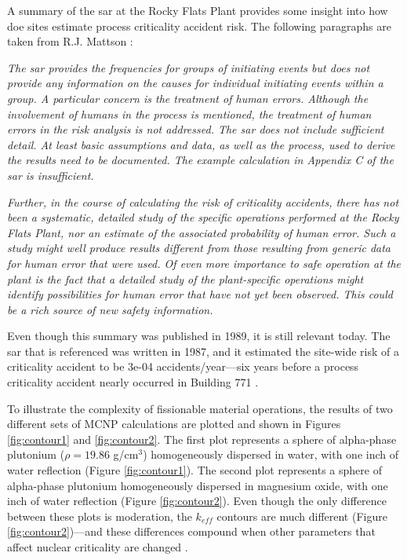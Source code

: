 A summary of the \gls{sar} at the Rocky Flats Plant \cite{mattson} provides some insight into how \gls{doe} sites estimate process criticality accident risk.
The following paragraphs are taken from R.J. Mattson \cite{mattson}:

\begin{displayquote}

  \textit{The \gls{sar} provides the frequencies for groups of initiating events but does not provide any information on the causes for individual initiating events within a group.
  A particular concern is the treatment of human errors.
  Although the involvement of humans in the process is mentioned, the treatment of human errors in the risk analysis is not addressed.
  The \gls{sar} does not include sufficient detail.
  At least basic assumptions and data, as well as the process, used to derive the results need to be documented.
  The example calculation in Appendix C of the \gls{sar} is insufficient.}

  \vspace{+0.4cm}

  \textit{Further, in the course of calculating the risk of criticality accidents, there has not been a systematic, detailed study of the specific operations performed at the Rocky Flats Plant, nor an estimate of the associated probability of human error.
  Such a study might well produce results different from those resulting from generic data for human error that were used.
  Of even more importance to safe operation at the plant is the fact that a detailed study of the plant-specific operations might identify possibilities for human error that have not yet been observed.
  This could be a rich source of new safety information.}

\end{displayquote}

\noindent Even though this summary was published in 1989, it is still relevant today.
The \gls{sar} that is referenced was written in 1987, and it estimated the site-wide risk of a criticality accident to be 3e-04 accidents/year---six years before a process criticality accident nearly occurred in Building 771 \cite{mckamy}.


To illustrate the complexity of fissionable material operations, the results of two different sets of MCNP calculations are plotted and shown in Figures \ref{fig:contour1} and \ref{fig:contour2}.
The first plot represents a sphere of alpha-phase plutonium ($\rho = 19.86$ g/cm$^{3}$) homogeneously dispersed in water, with one inch of water reflection (Figure \ref{fig:contour1}).
The second plot represents a sphere of alpha-phase plutonium homogeneously dispersed in magnesium oxide, with one inch of water reflection (Figure \ref{fig:contour2}).
Even though the only difference between these plots is moderation, the $k_{eff}$ contours are much different (Figure \ref{fig:contour2})---and these differences compound when other parameters that affect nuclear criticality are changed \cite{knief}.

